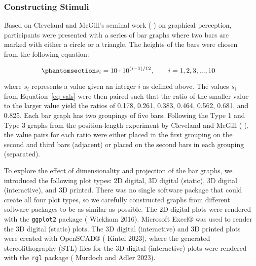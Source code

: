 \documentclass[
  12pt,
]{article}
\providecommand{\DIFdel}[1]{} %
\providecommand{\DIFadd}[1]{{\protect\color{blue} \sf #1}} %
\providecommand{\DIFdel}[1]{{\protect\color{red} [..\footnote{removed: #1} ]}} %
\providecommand{\DIFaddbegin}{} %
\providecommand{\DIFaddend}{} %
\providecommand{\DIFdelbegin}{} %
\providecommand{\DIFdelend}{} %
\newcommand{\DIFscaledelfig}{0.5}
\newlength{\DIFdelgraphicswidth} %
\newlength{\DIFdelgraphicsheight} %
\newcommand{\DIFaddincludegraphics}[2][]{{\color{blue}\fbox{\DIFOincludegraphics[#1]{#2}}}} %
\newcommand{\DIFdelincludegraphics}[2][]{%
\sbox{\DIFdelgraphicsbox}{\DIFOincludegraphics[#1]{#2}}%
\settoboxwidth{\DIFdelgraphicswidth}{\DIFdelgraphicsbox} %
\settoboxtotalheight{\DIFdelgraphicsheight}{\DIFdelgraphicsbox} %
\scalebox{\DIFscaledelfig}{%
\parbox[b]{\DIFdelgraphicswidth}{\usebox{\DIFdelgraphicsbox}\\[-\baselineskip] \rule{\DIFdelgraphicswidth}{0em}}\llap{\resizebox{\DIFdelgraphicswidth}{\DIFdelgraphicsheight}{%
\setlength{\unitlength}{\DIFdelgraphicswidth}%
\begin{picture}(1,1)%
\thicklines\linethickness{2pt} %
{\color[rgb]{1,0,0}\put(0,0){\framebox(1,1){}}}%
{\color[rgb]{1,0,0}\put(0,0){\line( 1,1){1}}}%
{\color[rgb]{1,0,0}\put(0,1){\line(1,-1){1}}}%
\end{picture}%
}\hspace*{3pt}}} %
} %
\DeclareRobustCommand{\DIFaddbegin}{\DIFOaddbegin \let\includegraphics\DIFaddincludegraphics} %
\DeclareRobustCommand{\DIFaddend}{\DIFOaddend \let\includegraphics\DIFOincludegraphics} %
\DeclareRobustCommand{\DIFdelbegin}{\DIFOdelbegin \let\includegraphics\DIFdelincludegraphics} %
\DeclareRobustCommand{\DIFdelend}{\DIFOaddend \let\includegraphics\DIFOincludegraphics} %
\begin{document}
\subsubsection{Constructing Stimuli}\label{constructing-stimuli}

Based on Cleveland and McGill's seminal work (\DIFdelbegin \DIFdel{\mbox{%
\citeproc{ref-cleveland1984}{1984}}\hskip0pt%
}\DIFdelend \DIFaddbegin \DIFadd{1984}\DIFaddend ) on graphical
perception, participants were presented with a series of bar graphs
where two bars are marked with either a circle or a triangle. The
heights of the bars were chosen from the following equation:

\begin{equation}\phantomsection\label{eq-vals}{s_i=10\cdot 10^{(i-1)/12}, \qquad i=1,2,3,...,10}\end{equation}

where \(s_i\) represents a value given an integer \(i\) as defined
above. The values \(s_i\) from Equation~\ref{eq-vals} were then paired
such that the ratio of the smaller value to the larger value yield the
ratios of 0.178, 0.261, 0.383, 0.464, 0.562, 0.681, and 0.825. Each bar
graph has two groupings of five bars. Following the Type 1 and Type 3
graphs from the position-length experiment by Cleveland and McGill
(\DIFdelbegin \DIFdel{\mbox{%
\citeproc{ref-cleveland1984}{1984}}\hskip0pt%
}\DIFdelend \DIFaddbegin \DIFadd{1984}\DIFaddend ), the value pairs for each ratio were either placed in the first
grouping on the second and third bars (adjacent) \DIFdelbegin \DIFdel{, }\DIFdelend or placed on the second
bars in each grouping (separated).

To explore the effect of dimensionality and projection of the bar
graphs, we introduced the following plot types: 2D digital, 3D digital
(static), 3D digital (interactive), and 3D printed. There was no single
software package that could create all four plot types, so we carefully
constructed graphs from different software packages to be as similar as
possible. The 2D digital plots were rendered with the \texttt{ggplot2}
package (\DIFdelbegin \DIFdel{\mbox{%
\citeproc{ref-ggplot2}{Wickham 2016}}\hskip0pt%
}\DIFdelend \DIFaddbegin \DIFadd{Wickham 2016}\DIFaddend ). Microsoft Excel® was used to render the 3D
digital (static) plots. The 3D digital (interactive) and 3D printed
plots were created with OpenSCAD® (\DIFdelbegin \DIFdel{\mbox{%
\citeproc{ref-kintelOpenSCADDocumentation2023}{Kintel 2023}}\hskip0pt%
}\DIFdelend \DIFaddbegin \DIFadd{Kintel 2023}\DIFaddend ), where the generated
stereolithography (STL) files for the 3D digital (interactive) plots
were rendered with the \texttt{rgl} package (\DIFdelbegin \DIFdel{\mbox{%
\citeproc{ref-rgl}{Murdoch and Adler 2023}}\hskip0pt%
}\DIFdelend \DIFaddbegin \DIFadd{Murdoch and Adler 2023}\DIFaddend ).
\end{document}
